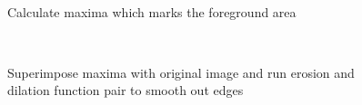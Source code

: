 \documentclass[12pt]{article}
\theoremstyle{plain}%
\theoremstyle{definition}
\theoremstyle{remark}
\begin{document}
\begin{figure}[!h]
\centering
\mbox{\quad
{}}
\caption{Calculate maxima which marks the foreground area}
\end{figure}
\begin{figure}[!h]
\centering
\mbox{\quad
{}}
\caption{Superimpose maxima with original image and run erosion and dilation function pair to smooth out edges}
\end{figure}
\end{document}
